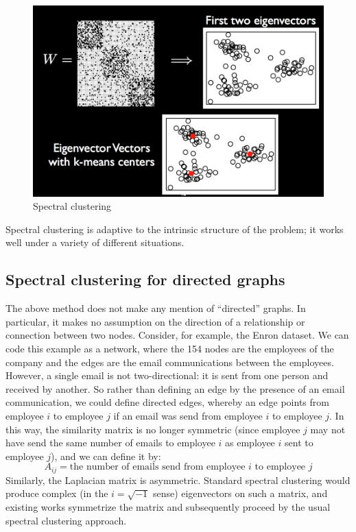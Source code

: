\begin{figure}[H]
\begin{center}
\includegraphics[scale=0.4]{spectral.png}
\end{center}
\caption{Spectral clustering}
\label{fig:spectral}
\end{figure}


Spectral clustering is adaptive to the intrinsic structure of the problem; it works well under a variety of different situations. 


\subsection*{Spectral clustering for directed graphs}

The above method does not make any mention of ``directed'' graphs. In particular, it makes no assumption on the direction of a relationship or connection between two nodes. Consider, for example, the Enron dataset. We can code this example as a network, where the 154 nodes are the employees of the company and the edges are the email communications between the employees. However, a single email is not two-directional: it is sent from one person and received by another. So rather than defining an edge by the presence of an email communication, we could define directed edges, whereby an edge points from employee $i$ to employee $j$ if an email was send from employee $i$ to employee $j$. In this way, the similarity matrix is no longer symmetric (since employee $j$ may not have send the same number of emails to employee $i$ as employee $i$ sent to employee $j$), and we can define it by:
$$A_{ij} = \text{the number of emails send from employee $i$ to employee $j$}$$
Similarly, the Laplacian matrix is asymmetric. Standard spectral clustering would produce complex (in the $i = \sqrt{-1}$ sense) eigenvectors on such a matrix, and existing works symmetrize the matrix and subsequently proceed by the usual spectral clustering approach. 

